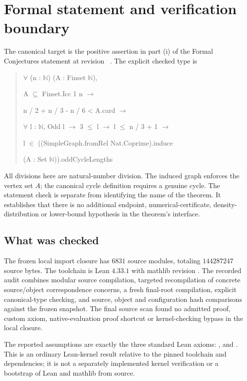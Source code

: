 \section{Formal statement and verification boundary}\label{sec:formal}
The canonical target is the positive assertion in part (i) of the Formal Conjectures statement at revision ~\cite{FC883}. The explicit checked type is
\begin{quote}\small\ttfamily
\ensuremath{\forall} (n : \ensuremath{\mathbb N}) (A : Finset \ensuremath{\mathbb N}),\par
\quad A \ensuremath{\subseteq} Finset.Icc 1 n \ensuremath{\to}\par
\quad n / 2 + n / 3 - n / 6 < A.card \ensuremath{\to}\par
\quad \ensuremath{\forall} l : \ensuremath{\mathbb N}, Odd l \ensuremath{\to} 3 \ensuremath{\le} l \ensuremath{\to} l \ensuremath{\le} n / 3 + 1 \ensuremath{\to}\par
\quad l \ensuremath{\in} ((SimpleGraph.fromRel Nat.Coprime).induce\par
\qquad (A : Set \ensuremath{\mathbb N})).oddCycleLengths
\end{quote}
All divisions here are natural-number division. The induced graph enforces the vertex set $A$; the canonical cycle definition requires a genuine cycle. The statement check is separate from identifying the name of the theorem. It establishes that there is no additional endpoint, numerical-certificate, density-distribution or lower-bound hypothesis in the theorem's interface.

\subsection{What was checked}
The frozen local import closure has $6831$ source modules, totaling $144287247$ source bytes. The toolchain is Lean $4.33.1$ with mathlib revision . The recorded audit combines modular source compilation, targeted recompilation of concrete source/object correspondence concerns, a fresh final-root compilation, explicit canonical-type checking, and source, object and configuration hash comparisons against the frozen snapshot. The final source scan found no admitted proof, custom axiom, native-evaluation proof shortcut or kernel-checking bypass in the local closure.

The reported assumptions are exactly the three standard Lean axioms: ,  and . This is an ordinary Lean-kernel result relative to the pinned toolchain and dependencies; it is not a separately implemented kernel verification or a bootstrap of Lean and mathlib from source.


